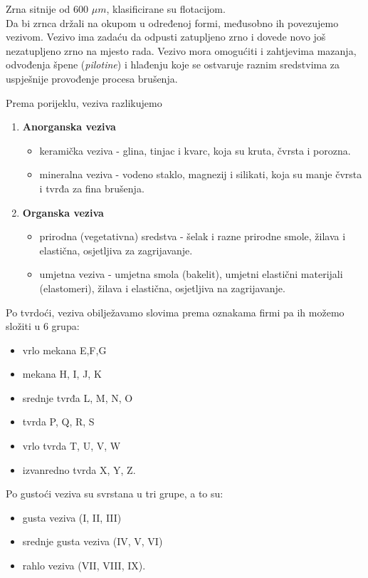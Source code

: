 \documentclass[a4paper,12pt]{article}
\numberwithin{figure}{section}
\begin{document}
Zrna sitnije od 600 $\mu m$, klasificirane su flotacijom. \\
Da bi zrnca držali na okupom u određenoj formi, međusobno ih povezujemo vezivom. Vezivo ima zadaću da odpusti zatupljeno zrno i dovede novo još nezatupljeno zrno na mjesto rada. Vezivo mora omogućiti i zahtjevima mazanja, odvođenja špene (\textit{pilotine}) i hlađenju koje se ostvaruje raznim sredstvima za uspješnije provođenje procesa brušenja. \par
Prema porijeklu, veziva razlikujemo 
\begin{enumerate}
\item \textbf{Anorganska veziva}
\begin{itemize}
\item keramička veziva - glina, tinjac i kvarc, koja su kruta, čvrsta i porozna.
\item mineralna veziva - vodeno staklo, magnezij i silikati, koja su manje čvrsta i tvrđa za fina brušenja.
\end{itemize}
\item \textbf{Organska veziva}
\begin{itemize}
\item prirodna (vegetativna) sredstva - šelak i razne prirodne smole, žilava i elastična, osjetljiva za zagrijavanje.
\item umjetna veziva - umjetna smola (bakelit), umjetni elastični materijali (elastomeri), žilava i elastična, osjetljiva na zagrijavanje.
\end{itemize}
\end{enumerate}
Po tvrdoći, veziva obilježavamo slovima prema oznakama firmi pa ih možemo složiti u 6 grupa:
\begin{itemize}
\item vrlo mekana E,F,G
\item mekana H, I, J, K
\item srednje tvrđa L, M, N, O
\item tvrda P, Q, R, S
\item vrlo tvrda T, U, V, W
\item izvanredno tvrda X, Y, Z.
\end{itemize}
Po gustoći veziva su svrstana u tri grupe, a to su:
\begin{itemize}
\item gusta veziva  (I, II, III)
\item srednje gusta veziva (IV, V, VI)
\item rahlo veziva (VII, VIII, IX).
\end{itemize}
\end{document}
